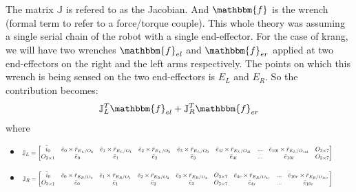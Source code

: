 \documentclass[a4paper,10pt]{article}
\newcommand\scalemath[2]{\scalebox{#1}{\mbox{\ensuremath{\displaystyle #2}}}}
\begin{document}
The matrix $\mathbb{J}$ is refered to as the Jacobian. And $\mathbbm{f}$ is the wrench (formal term to
refer to a force/torque couple). This whole theory was assuming a single serial chain of the robot with a single
end-effector. For the case of krang, we will have two wrenches $\mathbbm{f}_{el}$ and $\mathbbm{f}_{er}$ applied at 
two end-effectors on the right and the left arms respectively. The points on which this wrench is being sensed
on the two end-effectors is $E_L$ and $E_R$. So the contribution becomes:
\begin{align}
 \mathbb{J}_{L}^T\mathbbm{f}_{el} + \mathbb{J}_{R}^T\mathbbm{f}_{er}
\end{align} where
\begin{itemize}
 \item $\scalemath{0.65}{\mathbb{J}_{L} = \left[ \begin{matrix} \bar{i}_0 & \bar{e}_0 \times \bar{r}_{E_L/O_0} & \bar{e}_1\times \bar{r}_{E_L/O_1} & \bar{e}_2\times \bar{r}_{E_L/O_2} 
 & \bar{e}_3\times \bar{r}_{E_L/O_3} & \bar{e}_{4l}\times \bar{r}_{E_L/O_{4l}} & ... & \bar{e}_{10l}\times \bar{r}_{E_L/O_{10l}} & O_{3\times 7} \\ 
 O_{3\times1} & \bar{e}_0 & \bar{e}_1 & \bar{e}_2 & \bar{e}_3 & \bar{e}_{4l} & ... & \bar{e}_{10l} & O_{3\times 7} \end{matrix} \right]}$
 \item $\scalemath{0.64}{\mathbb{J}_{R} = \left[ \begin{matrix} \bar{i}_0 & \bar{e}_0 \times \bar{r}_{E_R/O_0} & \bar{e}_1\times \bar{r}_{E_R/O_1} & \bar{e}_2\times \bar{r}_{E_R/O_2} 
 & \bar{e}_3\times \bar{r}_{E_R/O_3} & O_{3\times 7} & \bar{e}_{4r}\times \bar{r}_{E_R/O_{4r}} & ... & \bar{e}_{10r}\times \bar{r}_{E_R/O_{10r}} \\ 
 O_{3\times1} & \bar{e}_0 & \bar{e}_1 & \bar{e}_2 & \bar{e}_3 & O_{3\times 7} & \bar{e}_{4r} & ... & \bar{e}_{10r}  \end{matrix} \right]}$
\end{itemize}
\end{document}
